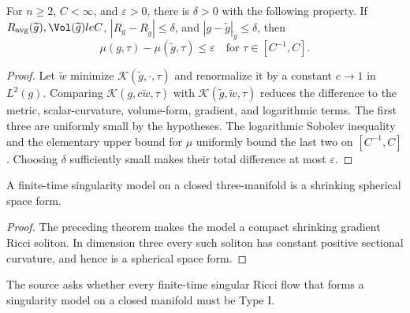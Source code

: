 \begin{lemma}
\label{lem:chow-iii-ch17-mu-continuity}
For $n\ge2$, $C<\infty$, and $\varepsilon>0$, there is $\delta>0$ with
the following property.  If $R_{\rm avg}(\widetilde g),\Vol(\widetilde g)le C$,
$|R_g-R_{\widetilde g}|\le\delta$, and
$|g-\widetilde g|_{\widetilde g}\le\delta$, then
\[
 \mu(g,\tau)-\mu(\widetilde g,\tau)\le\varepsilon
 \quad\text{for }\tau\in[C^{-1},C].
\]
\end{lemma}
\begin{proof}
\sketch Let $\widetilde w$ minimize $\mathcal K(\widetilde g,\cdot,\tau)$ and
renormalize it by a constant $c\to1$ in $L^2(g)$.  Comparing
$\mathcal K(g,c\widetilde w,\tau)$ with
$\mathcal K(\widetilde g,\widetilde w,\tau)$ reduces the difference to the
metric, scalar-curvature, volume-form, gradient, and logarithmic terms.
The first three are uniformly small by the hypotheses.  The logarithmic
Sobolev inequality and the elementary upper bound for $\mu$ uniformly bound
the last two on $[C^{-1},C]$.  Choosing $\delta$ sufficiently small makes
their total difference at most $\varepsilon$.
\end{proof}

\begin{corollary}
\label{cor:chow-iii-ch17-closed-three-model-round}
A finite-time singularity model on a closed three-manifold is a shrinking
spherical space form.
\end{corollary}
\begin{proof}
\sketch The preceding theorem makes the model a compact shrinking gradient Ricci
soliton.  In dimension three every such soliton has constant positive
sectional curvature, and hence is a spherical space form.
\end{proof}

\begin{remark}
\label{rem:chow-iii-ch17-compact-model-type-i-problem}
The source asks whether every finite-time singular Ricci flow that forms a
singularity model on a closed manifold must be Type I.
\end{remark}

